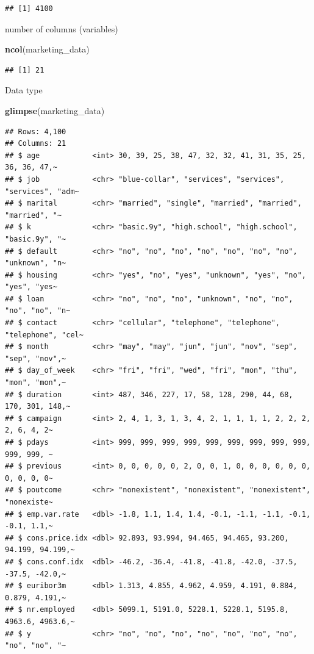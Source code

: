 \documentclass[
]{article}
\newenvironment{Shaded}{\begin{snugshade}}{\end{snugshade}}
\newcommand{\FunctionTok}[1]{\textcolor[rgb]{0.13,0.29,0.53}{\textbf{#1}}}
\newcommand{\NormalTok}[1]{#1}
\begin{document}
\begin{verbatim}
## [1] 4100
\end{verbatim}

number of columns (variables)

\begin{Shaded}
\begin{Highlighting}[]
\FunctionTok{ncol}\NormalTok{(marketing\_data)}
\end{Highlighting}
\end{Shaded}

\begin{verbatim}
## [1] 21
\end{verbatim}

Data type

\begin{Shaded}
\begin{Highlighting}[]
\FunctionTok{glimpse}\NormalTok{(marketing\_data)}
\end{Highlighting}
\end{Shaded}

\begin{verbatim}
## Rows: 4,100
## Columns: 21
## $ age            <int> 30, 39, 25, 38, 47, 32, 32, 41, 31, 35, 25, 36, 36, 47,~
## $ job            <chr> "blue-collar", "services", "services", "services", "adm~
## $ marital        <chr> "married", "single", "married", "married", "married", "~
## $ k              <chr> "basic.9y", "high.school", "high.school", "basic.9y", "~
## $ default        <chr> "no", "no", "no", "no", "no", "no", "no", "unknown", "n~
## $ housing        <chr> "yes", "no", "yes", "unknown", "yes", "no", "yes", "yes~
## $ loan           <chr> "no", "no", "no", "unknown", "no", "no", "no", "no", "n~
## $ contact        <chr> "cellular", "telephone", "telephone", "telephone", "cel~
## $ month          <chr> "may", "may", "jun", "jun", "nov", "sep", "sep", "nov",~
## $ day_of_week    <chr> "fri", "fri", "wed", "fri", "mon", "thu", "mon", "mon",~
## $ duration       <int> 487, 346, 227, 17, 58, 128, 290, 44, 68, 170, 301, 148,~
## $ campaign       <int> 2, 4, 1, 3, 1, 3, 4, 2, 1, 1, 1, 1, 2, 2, 2, 2, 6, 4, 2~
## $ pdays          <int> 999, 999, 999, 999, 999, 999, 999, 999, 999, 999, 999, ~
## $ previous       <int> 0, 0, 0, 0, 0, 2, 0, 0, 1, 0, 0, 0, 0, 0, 0, 0, 0, 0, 0~
## $ poutcome       <chr> "nonexistent", "nonexistent", "nonexistent", "nonexiste~
## $ emp.var.rate   <dbl> -1.8, 1.1, 1.4, 1.4, -0.1, -1.1, -1.1, -0.1, -0.1, 1.1,~
## $ cons.price.idx <dbl> 92.893, 93.994, 94.465, 94.465, 93.200, 94.199, 94.199,~
## $ cons.conf.idx  <dbl> -46.2, -36.4, -41.8, -41.8, -42.0, -37.5, -37.5, -42.0,~
## $ euribor3m      <dbl> 1.313, 4.855, 4.962, 4.959, 4.191, 0.884, 0.879, 4.191,~
## $ nr.employed    <dbl> 5099.1, 5191.0, 5228.1, 5228.1, 5195.8, 4963.6, 4963.6,~
## $ y              <chr> "no", "no", "no", "no", "no", "no", "no", "no", "no", "~
\end{verbatim}
\end{document}
